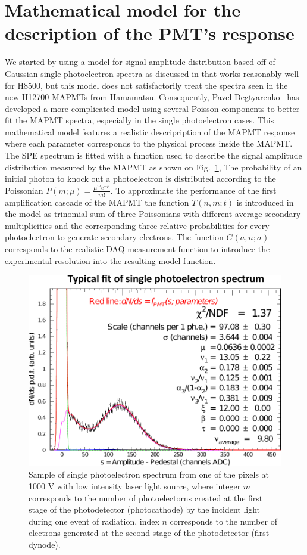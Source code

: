 \section{Mathematical model for the description of the PMT's response}


We started by using a model for signal amplitude distribution based off of Gaussian single photoelectron spectra as discussed in \cite{Bellamy:1994bv} that works reasonably well for H8500, but this model does not satisfactorily treat the spectra seen in the new H12700 MAPMTs from Hamamatsu. Consequently, Pavel Degtyarenko~\cite{DEGTIARENKO20171} has developed a more complicated model using several Poisson components to better fit the MAPMT spectra, especially in the single photoelectron cases.
This mathematical model features a realistic descripription of the MAPMT response where each parameter corresponds to the physical process inside the MAPMT.
The SPE spectrum is fitted with a function used to describe the signal amplitude distribution measured by the MAPMT as shown on Fig.~\ref{fig:SPEfit},
The probability of an initial photon to knock out a photoelectron is distributed according to the Poissonian $P(m;\mu)=\frac{\mu^me^{-\mu}}{m!}$.
To approximate the performance of the first amplification cascade of the MAPMT the function $T(n,m;t)$ is introduced in the model as trinomial sum of three Poissonians with different average secondary multiplicities and the corresponding three relative probabilities for every photoelectron to generate secondary electrons.
The function $G(a,n;\sigma)$ corresponds to the realistic DAQ measurement function to introduce the experimental resolution into the resulting model function.

\begin{figure}[bt]
	\centering
	\includegraphics[width=\linewidth]{figures/SPEfit.pdf}
	\caption{Sample of single photoelectron spectrum from one of the pixels at 1000 V with low intensity laser light source,
where integer $m$ corresponds to the number of photoelectorns created at the first stage of the photodetector (photocathode) by the incident light during one event of radiation, index $n$ corresponds to the number of electrons generated at the second stage of the photodetector (first dynode).
}
\label{fig:SPEfit}
\end{figure}

